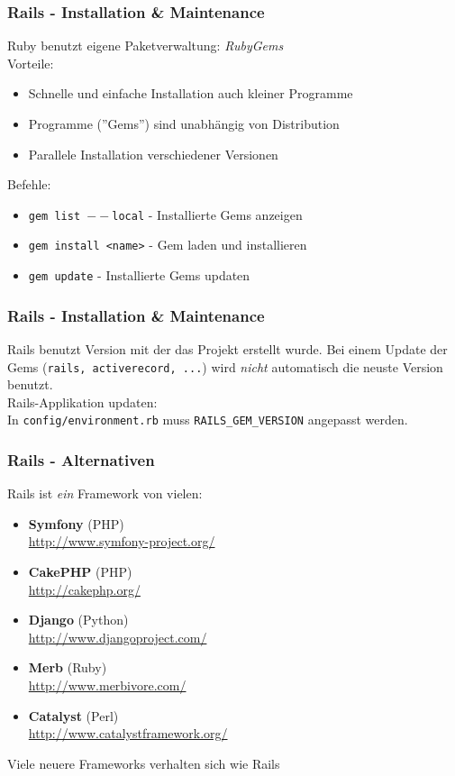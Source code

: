 \begin{frame}
  \frametitle{Rails - Installation \& Maintenance}
  Ruby benutzt eigene Paketverwaltung: \emph{RubyGems} \\
  \vspace{0.3cm}
  Vorteile:
  \begin{itemize}
    \item Schnelle und einfache Installation auch kleiner Programme
    \item Programme (''Gems'') sind unabhängig von Distribution
    \item Parallele Installation verschiedener Versionen
  \end{itemize}
  \vspace{0.3cm}
  Befehle:
  \begin{itemize}
    \item {\tt gem list $--$local} - Installierte Gems anzeigen
    \item {\tt gem install <name>} - Gem laden und installieren
    \item {\tt gem update} - Installierte Gems updaten
  \end{itemize}
\end{frame}

\begin{frame}
  \frametitle{Rails - Installation \& Maintenance}
  Rails benutzt Version mit der das Projekt erstellt wurde. Bei einem
  Update der Gems ({\tt rails, activerecord, ...}) wird \emph{nicht} automatisch
  die neuste Version benutzt. \\
  \vspace{0.3cm}
  Rails-Applikation updaten: \\
  \vspace{0.2cm}
  In {\tt config/environment.rb} muss {\tt RAILS\_GEM\_VERSION} angepasst werden.
\end{frame}

\begin{frame}
  \frametitle{Rails - Alternativen}
  Rails ist \emph{ein} Framework von vielen:
  \begin{itemize}
    \item {\bf Symfony} (PHP) \\ \url{http://www.symfony-project.org/}
    \item {\bf CakePHP} (PHP) \\ \url{http://cakephp.org/}
    \item {\bf Django} (Python) \\ \url{http://www.djangoproject.com/}
    \item {\bf Merb} (Ruby) \\ \url{http://www.merbivore.com/}
    \item {\bf Catalyst} (Perl) \\ \url{http://www.catalystframework.org/}
  \end{itemize}
  Viele neuere Frameworks verhalten sich wie Rails
\end{frame}

